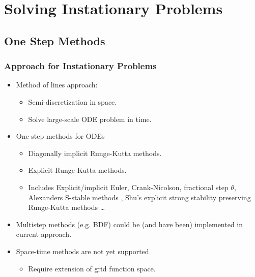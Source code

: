 \section{Solving Instationary Problems}

\subsection{One Step Methods}

\begin{frame}
\frametitle{Approach for Instationary Problems}
\begin{itemize}
\item Method of lines approach:
\begin{itemize}
\item Semi-discretization in space.
\item Solve large-scale ODE problem in time.
\end{itemize}
\item One step methods for ODEs
\begin{itemize}
\item Diagonally implicit Runge-Kutta methods.
\item Explicit Runge-Kutta methods.
\item Includes Explicit/implicit Euler, Crank-Nicolson, fractional
step $\theta$, Alexanders S-stable methods \cite{alexander:77},
Shu's explicit strong stability preserving Runge-Kutta methods \cite{shu:88}\ldots
\end{itemize}
\item Multistep methods (e.g. BDF) could be (and have been) implemented in current approach.
\item Space-time methods are not yet supported
\begin{itemize}
\item Require extension of grid function space.
\end{itemize}
\end{itemize}
\end{frame}

